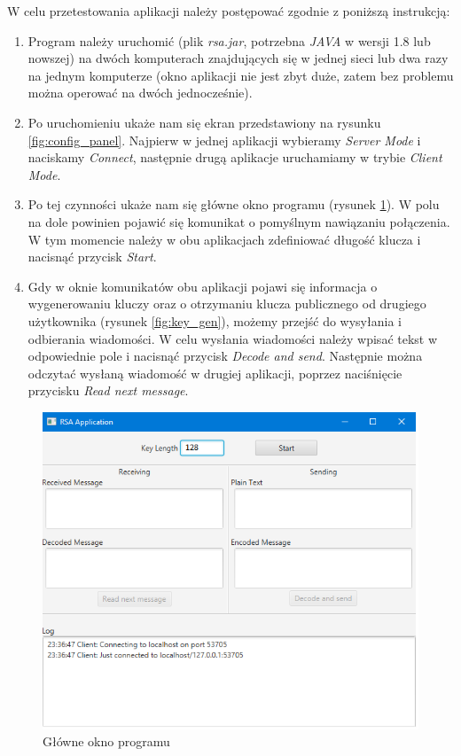 \documentclass[10pt,a4paper]{article}
\begin{document}
W celu przetestowania aplikacji należy postępować zgodnie z poniższą instrukcją:

\begin{enumerate}
\item Program należy uruchomić (plik \textit{rsa.jar}, potrzebna \textit{JAVA} w wersji 1.8 lub nowszej) na dwóch komputerach znajdujących się w jednej sieci lub dwa razy na jednym komputerze (okno aplikacji nie jest zbyt duże, zatem bez problemu można operować na dwóch jednocześnie).

\item Po uruchomieniu ukaże nam się ekran przedstawiony na rysunku \ref{fig:config_panel}. Najpierw w jednej aplikacji wybieramy \textit{Server Mode} i naciskamy \textit{Connect}, następnie drugą aplikacje uruchamiamy w trybie \textit{Client Mode}.

\item Po tej czynności ukaże nam się główne okno programu (rysunek \ref{fig:main_window}). W polu na dole powinien pojawić się komunikat o pomyślnym nawiązaniu połączenia. W tym momencie należy w obu aplikacjach zdefiniować długość klucza i nacisnąć przycisk \textit{Start}.

\item Gdy w oknie komunikatów obu aplikacji pojawi się informacja o wygenerowaniu kluczy oraz o otrzymaniu klucza publicznego od drugiego użytkownika (rysunek \ref{fig:key_gen}), możemy przejść do wysyłania i odbierania wiadomości. W celu wysłania wiadomości należy wpisać tekst w odpowiednie pole i nacisnąć przycisk \textit{Decode and send}. Następnie można odczytać wysłaną wiadomość w drugiej aplikacji, poprzez naciśnięcie przycisku \textit{Read next message}.
\end{enumerate}

\begin{figure}[!t]
	\centering
	\includegraphics[scale=0.85]{img/main_window.png}
	\caption{Główne okno programu}
	\label{fig:main_window}
\end{figure}
\end{document}
